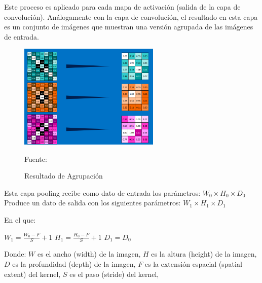 		Este proceso es aplicado para cada mapa de activación (salida de la capa de convolución). Análogamente con la capa de convolución, el resultado en esta capa es un conjunto de imágenes que muestran una versión agrupada de las imágenes de entrada.

		\begin{figure}[H]
		\begin{center}
		\includegraphics[width=0.6\textwidth]{images/marcoteorico/pool2}
		\end{center}
		\begin{center}
		\caption{\small{Resultado de Agrupación}}
		\vskip -0.2cm  
		{\small{Fuente: \cite{Rohrer}}}
		\end{center}
		\vspace{-1.5em}
		\end{figure}


		\noindent Esta capa pooling recibe como dato de entrada los parámetros:
		${W_{0}}\times{H_{0}}\times{D_{0}}$ \newline
		Produce un dato de salida con los siguientes parámetros: ${W_{1}}\times{H_{1}}\times{D_{1}}$\newline		
		\begin{minipage}[t]{0.5\textwidth}
		En el que:
		\begin{center}
		 ${W_{1}} = \frac{{W_{0}} - F }{S} +1$ 
		\vskip 0.4cm 
		 ${H_{1}} = \frac{{H_{0}} - F }{S} +1$ 
		\vskip 0.4cm 
		 ${D_{1}} = {D_{0}}$ 
		 \end{center}
		\vskip 0.6cm 
		\end{minipage}
		\begin{minipage}[t]{0.55\textwidth}
		Donde:
		\vskip 0.1cm 
		$W$ es el ancho (width) de la imagen, \vskip 0.4cm  
		$H$ es la altura (height) de la imagen,\vskip 0.4cm 
		$D$ es la profundidad (depth) de la imagen,\vskip 0.4cm 
		$F$ es la extensión espacial (spatial extent) del kernel,\vskip 0.4cm 
		$S$ es el paso (stride) del kernel,\vskip 0.4cm 
		\end{minipage}

